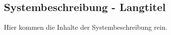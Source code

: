 \begin{showSystem}%
%
\chapter[Systembeschreibung - Kurztitel für Inhaltsverzeichnis und Kolumnentitel]{Systembeschreibung - Langtitel}%
\label{chap:SystemDescription}
%
Hier kommen die Inhalte der Systembeschreibung rein.
%

%
\end{showSystem}%
